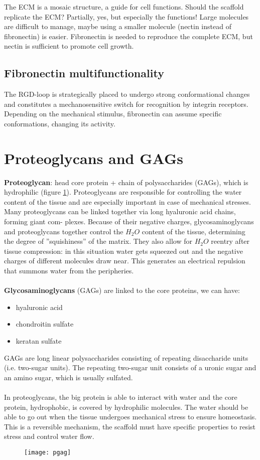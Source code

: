 \noindent
The ECM is a mosaic structure, a guide for cell functions.
Should the scaffold replicate the ECM? Partially, yes, but especially the functions! 
Large molecules are difficult to manage, maybe using a smaller molecule (nectin instead of fibronectin) is easier.
Fibronectin is needed to reproduce the complete ECM, but nectin is sufficient to promote cell growth.

\subsection{Fibronectin multifunctionality}
The RGD-loop is strategically placed to undergo strong conformational changes and constitutes a mechanosensitive switch for recognition by integrin receptors.
Depending on the mechanical stimulus, fibronectin can assume specific conformations, changing its activity.

\section{Proteoglycans and GAGs}

\textbf{Proteoglycan}: head core protein + chain of polysaccharides (GAGs), which is hydrophilic (figure \ref{fig:pgag}). 
Proteoglycans are responsible for controlling the water content of the tissue and are especially important in case of mechanical stresses.
Many proteoglycans can be linked together via long hyaluronic acid chains, forming giant com- plexes. 
Because of their negative charges, glycosaminoglycans and proteoglycans together control the $H_2O$ content of the tissue, determining the degree of ”squishiness” of the matrix. 
They also allow for $H_2O$ reentry after tissue compression: in this situation water gets squeezed out and the negative charges of different molecules draw near. 
This generates an electrical repulsion that summons water from the peripheries.
\\
\\
\noindent
\textbf{Glycosaminoglycans} (GAGs) are linked to the core proteins, we can have:
\begin{itemize}
\item hyaluronic acid
\item chondroitin sulfate
\item keratan sulfate
\end{itemize}
\noindent
GAGs are long linear polysaccharides consisting of repeating disaccharide units (i.e. two-sugar units). 
The repeating two-sugar unit consists of a uronic sugar and an amino sugar, which is usually sulfated. 
\\
\\
\noindent
In proteoglycans, the big protein is able to interact with water and the core protein, hydrophobic, is covered by hydrophilic molecules.
The water should be able to go out when the tissue undergoes mechanical stress to ensure homeostasis.
This is a reversible mechanism,  the scaffold must have specific properties to resist stress and control water flow.
\begin{figure}[ht]
\centering
\texttt{[image: pgag]}
\caption{\label{fig:pgag}}
\end{figure}

